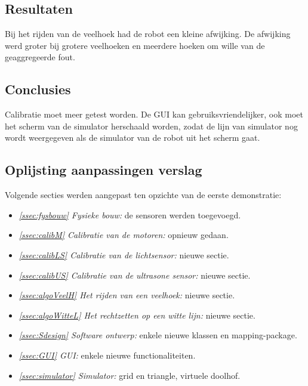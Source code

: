 \documentclass[tt3]{penoverslag}
\begin{document}
\subsection{Resultaten} %
\label{Assec:result1}
Bij het rijden van de veelhoek had de robot een kleine afwijking. De afwijking werd groter bij grotere veelhoeken en meerdere hoeken om wille van de geaggregeerde fout.

\subsection{Conclusies} %
\label{Assec:conc1}
Calibratie moet meer getest worden. De GUI kan gebruiksvriendelijker, ook moet het scherm van de simulator herschaald worden, zodat de lijn van simulator nog wordt weergegeven als de simulator van de robot uit het scherm gaat.

\subsection{Oplijsting aanpassingen verslag} %
\label{Assec:aanp1}
Volgende secties werden aangepast ten opzichte van de eerste demonstratie:

\begin{itemize}
\item \textit{\ref{ssec:fysbouw} Fysieke bouw:} de sensoren werden toegevoegd.
\item \textit{\ref{ssec:calibM} Calibratie van de motoren:} opnieuw gedaan.
\item \textit{\ref{ssec:calibLS} Calibratie van de lichtsensor:} nieuwe sectie.
\item \textit{\ref{ssec:calibUS} Calibratie van de ultrasone sensor:} nieuwe sectie.
\item \textit{\ref{ssec:algoVeelH} Het rijden van een veelhoek:} nieuwe sectie.
\item \textit{\ref{ssec:algoWitteL} Het rechtzetten op een witte lijn:} nieuwe sectie.
\item \textit{\ref{ssec:Sdesign} Software ontwerp:} enkele nieuwe klassen en mapping-package.
\item \textit{\ref{ssec:GUI} GUI:} enkele nieuwe functionaliteiten.
\item \textit{\ref{ssec:simulator} Simulator:} grid en triangle, virtuele doolhof.
\end{itemize}

\newpage


\end{document}
